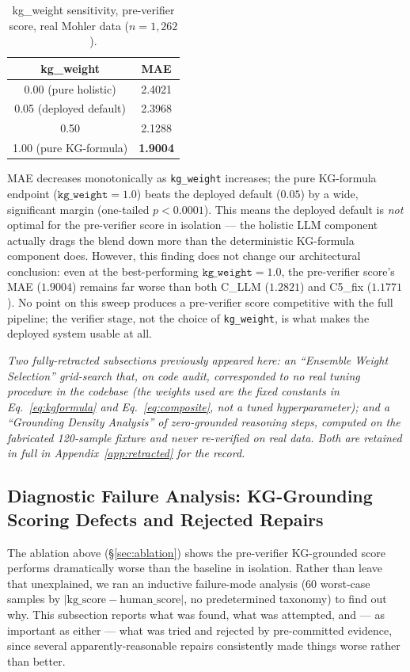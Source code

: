 \documentclass[conference]{IEEEtran}
\begin{document}
\begin{table}[ht]
\centering
\caption{kg\_weight sensitivity, pre-verifier score, real Mohler data ($n=1{,}262$).}
\label{tab:kgweight_sweep}
\small
\begin{tabular}{cc}
\toprule
\textbf{kg\_weight} & \textbf{MAE} \\
\midrule
0.00 (pure holistic) & 2.4021 \\
0.05 (deployed default) & 2.3968 \\
0.50 & 2.1288 \\
1.00 (pure KG-formula) & \textbf{1.9004} \\
\bottomrule
\end{tabular}
\end{table}

MAE decreases monotonically as \texttt{kg\_weight} increases; the pure
KG-formula endpoint ($\texttt{kg\_weight}=1.0$) beats the deployed
default ($0.05$) by a wide, significant margin (one-tailed $p<0.0001$).
This means the deployed default is \emph{not} optimal for the
pre-verifier score in isolation --- the holistic LLM component actually
drags the blend down more than the deterministic KG-formula component
does. However, this finding does not change our architectural
conclusion: even at the best-performing $\texttt{kg\_weight}=1.0$, the
pre-verifier score's MAE ($1.9004$) remains far worse than both C\_LLM
($1.2821$) and C5\_fix ($1.1771$). No point on this sweep produces a
pre-verifier score competitive with the full pipeline; the verifier
stage, not the choice of \texttt{kg\_weight}, is what makes the
deployed system usable at all.

\textit{Two fully-retracted subsections previously appeared here: an
``Ensemble Weight Selection'' grid-search that, on code audit,
corresponded to no real tuning procedure in the codebase (the weights
used are the fixed constants in Eq.~\ref{eq:kgformula} and
Eq.~\ref{eq:composite}, not a tuned hyperparameter); and a ``Grounding
Density Analysis'' of zero-grounded reasoning steps, computed on the
fabricated 120-sample fixture and never re-verified on real data. Both
are retained in full in Appendix~\ref{app:retracted} for the record.}


\subsection{Diagnostic Failure Analysis: KG-Grounding Scoring Defects and Rejected Repairs}
\label{subsec:diagnostic_failure}

The ablation above (\S\ref{sec:ablation}) shows the pre-verifier
KG-grounded score performs dramatically worse than the baseline in
isolation. Rather than leave that unexplained, we ran an inductive
failure-mode analysis (60 worst-case samples by
$|\text{kg\_score}-\text{human\_score}|$, no predetermined taxonomy) to
find out why. This subsection reports what was found, what was
attempted, and — as important as either — what was tried and rejected by
pre-committed evidence, since several apparently-reasonable repairs
consistently made things worse rather than better.
\end{document}
